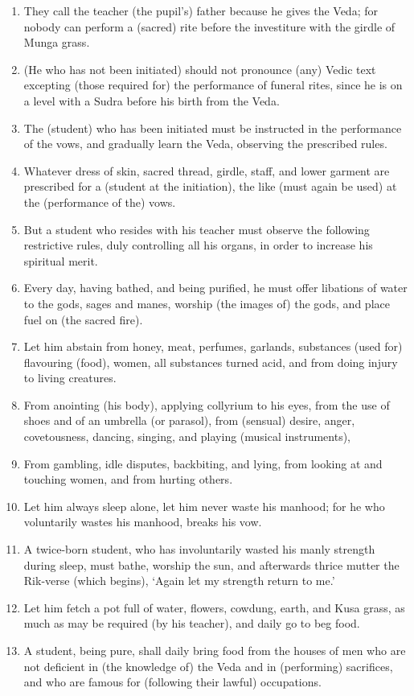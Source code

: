 \begin{enumerate}
\item They call the teacher (the pupil's) father because he gives the Veda; for nobody can perform a (sacred) rite before the investiture with the girdle of Munga grass.
\item (He who has not been initiated) should not pronounce (any) Vedic text excepting (those required for) the performance of funeral rites, since he is on a level with a Sudra before his birth from the Veda.
\item The (student) who has been initiated must be instructed in the performance of the vows, and gradually learn the Veda, observing the prescribed rules.
\item Whatever dress of skin, sacred thread, girdle, staff, and lower garment are prescribed for a (student at the initiation), the like (must again be used) at the (performance of the) vows.
\item But a student who resides with his teacher must observe the following restrictive rules, duly controlling all his organs, in order to increase his spiritual merit.
\item Every day, having bathed, and being purified, he must offer libations of water to the gods, sages and manes, worship (the images of) the gods, and place fuel on (the sacred fire).
\item Let him abstain from honey, meat, perfumes, garlands, substances (used for) flavouring (food), women, all substances turned acid, and from doing injury to living creatures.
\item From anointing (his body), applying collyrium to his eyes, from the use of shoes and of an umbrella (or parasol), from (sensual) desire, anger, covetousness, dancing, singing, and playing (musical instruments),
\item From gambling, idle disputes, backbiting, and lying, from looking at and touching women, and from hurting others.
\item Let him always sleep alone, let him never waste his manhood; for he who voluntarily wastes his manhood, breaks his vow.
\item A twice-born student, who has involuntarily wasted his manly strength during sleep, must bathe, worship the sun, and afterwards thrice mutter the Rik-verse (which begins), `Again let my strength return to me.'
\item Let him fetch a pot full of water, flowers, cowdung, earth, and Kusa grass, as much as may be required (by his teacher), and daily go to beg food.
\item A student, being pure, shall daily bring food from the houses of men who are not deficient in (the knowledge of) the Veda and in (performing) sacrifices, and who are famous for (following their lawful) occupations.

\end{enumerate}
